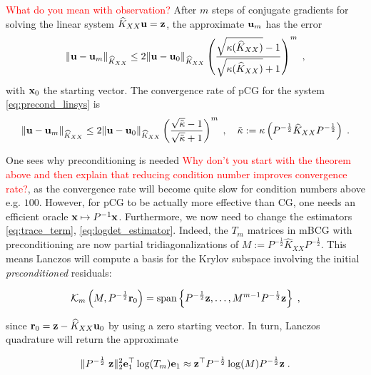 \documentclass{article}
\begin{document}
{\begin{observation}
\textcolor{red}{What do you mean with observation?} After $m$ steps of conjugate gradients for solving the linear system $\widehat K_{XX} \boldsymbol{\mathbf{u}} = \boldsymbol{\mathbf{z}}$, the approximate $\boldsymbol{\mathbf{u}}_m$ has the error
\begin{equation*}
    \Vert \boldsymbol{\mathbf{u}} - \boldsymbol{\mathbf{u}}_m \Vert_{\widehat K_{XX}} \le 2\Vert \boldsymbol{\mathbf{u}} - \boldsymbol{\mathbf{u}}_0 \Vert_{\widehat K_{XX}} \left(  \frac{\sqrt{\kappa(\widehat K_{XX})} - 1}{\sqrt{ \kappa(\widehat K_{XX})} + 1} \right)^m \; ,
\end{equation*}
with $\boldsymbol{\mathbf{x}}_0$ the starting vector. The convergence rate of pCG for the system \eqref{eq:precond_linsys} is
\begin{equation*}
    \Vert \boldsymbol{\mathbf{u}} - \boldsymbol{\mathbf{u}}_m \Vert_{\widehat K_{XX}} \le 2\Vert \boldsymbol{\mathbf{u}} - \boldsymbol{\mathbf{u}}_0 \Vert_{\widehat K_{XX}}  \left( \frac{\sqrt{\tilde \kappa } - 1}{\sqrt{\tilde \kappa} + 1} \right)^m \; , \quad 
    \tilde \kappa := \kappa\left( P^{-\frac 1 2} \widehat K_{XX} P^{-\frac 1 2} \right) \; .
\end{equation*}
\end{observation}

One sees why preconditioning is needed \textcolor{red}{Why don't you start with the theorem above and then explain that reducing condition number improves convergence rate?}, as the convergence rate will become quite slow for condition numbers above e.g. $100$. However, for pCG to be actually more effective than CG, one needs an efficient oracle $\boldsymbol{\mathbf{x}} \mapsto P^{-1} \boldsymbol{\mathbf{x}}$. Furthermore, we now need to change the estimators \eqref{eq:trace_term}, \eqref{eq:logdet_estimator}. Indeed, the $T_m$ matrices in mBCG with preconditioning are now partial tridiagonalizations of $M := P^{-\frac 1 2} \widehat K_{XX} P^{-\frac 1 2}$. This means Lanczos will compute a basis for the Krylov subspace involving the initial \emph{preconditioned} residuals:

\begin{equation*}
    \mathcal K_m \left(M, P^{-\frac 1 2} \boldsymbol{\mathbf{r}}_0 \right) = \text{span} \left\{P^{-\frac 1 2} \boldsymbol{\mathbf{z}}, \ldots, M^{m-1} P^{-\frac 1 2} \boldsymbol{\mathbf{z}} \right\} \; ,
\end{equation*}

since $\boldsymbol{\mathbf{r}}_0 = \boldsymbol{\mathbf{z}} - \widehat K_{XX} \boldsymbol{\mathbf{u}}_0$ by using a zero starting vector. In turn, Lanczos quadrature will return the approximate 

\begin{equation*}
    \Vert P^{-\frac 1 2} \; \boldsymbol{\mathbf{z}} \Vert_2^2 \boldsymbol{\mathbf{e}}_1^\top \log(T_m) \boldsymbol{\mathbf{e}}_1 
    \approx \boldsymbol{\mathbf{z}}^\top  P^{-\frac 1 2} \log(M) P^{-\frac 1 2} \boldsymbol{\mathbf{z}}  \; .    
\end{equation*}

}
\end{document}
